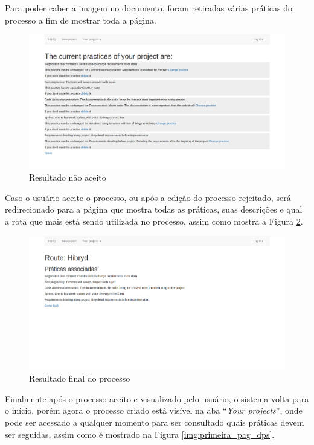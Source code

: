 Para poder caber a imagem no documento, foram retiradas várias práticas do processo a fim de mostrar toda a página.

\begin{figure}[H]
	\centering
	\includegraphics[scale=0.3]{imgFerramenta/edicaoQuestionario}
	\caption{Resultado não aceito}
	\label{img:questio_nao_aceito}
\end{figure}

Caso o usuário aceite o processo, ou após a edição do processo rejeitado, será redirecionado para a página que mostra todas as práticas, suas descrições e qual a rota que mais está sendo utilizada no processo, assim como mostra a Figura \ref{img:resultado_processo}.

\begin{figure}[H]
	\centering
	\includegraphics[scale=0.3]{imgFerramenta/resultado}
	\caption{Resultado final do processo}
	\label{img:resultado_processo}
\end{figure}

Finalmente após o processo aceito e visualizado pelo usuário, o sistema volta para o início, porém agora o processo criado está visível na aba ``\textit{Your projects}'', onde pode ser acessado a qualquer momento para ser consultado quais práticas devem ser seguidas, assim como é mostrado na Figura \ref{img:primeira_pag_dps}.

